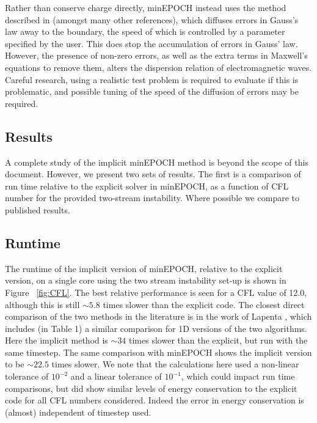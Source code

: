 \documentclass{article}
\begin{document}
Rather than conserve charge directly, minEPOCH instead uses the method described in \cite{markidis} (amongst many other references), which diffuses errors in Gauss's law away to the boundary, the speed of which is controlled by a parameter specified by the user. This does stop the accumulation of errors in Gauss' law. However, the presence of non-zero errors, as well as the extra terms in Maxwell's equations to remove them, alters the dispersion relation of electromagnetic waves. Careful research, using a realistic test problem is required to evaluate if this is problematic, and possible tuning of the speed of the diffusion of errors may be required.

\subsection{Results}

A complete study of the implicit minEPOCH method is beyond the scope of this document. However, we present two sets of results. The first is a comparison of run time relative to the explicit solver in minEPOCH, as a function of CFL number for the provided two-stream instability. Where possible we compare to published results.

\subsection{Runtime}

The runtime of the implicit version of minEPOCH, relative to the explicit version, on a single core using the two stream instability set-up is shown in Figure ~\ref{fig:CFL}. The best relative performance is seen for a CFL value of 12.0, although this is still $\sim 5.8$ times slower than the explicit code. The closest direct comparison of the two methods in the literature is in the work of Lapenta \cite{lapenta}, which includes (in Table 1) a similar comparison for 1D versions of the two algorithms. Here the implicit method is $\sim 34$ times slower than the explicit, but run with the same timestep. The same comparison with minEPOCH shows the implicit version to be $\sim 22.5$ times slower. We note that the calculations here used a non-linear tolerance of $10^{-2}$ and a linear tolerance of $10^{-1}$, which could impact run time comparisons, but did show similar levels of energy conservation to the explicit code for all CFL numbers considered. Indeed the error in energy conservation is (almost) independent of timestep used.
\end{document}
